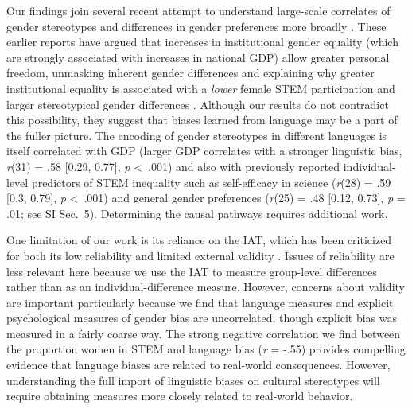 \documentclass[9pt,twocolumn,twoside,lineno]{pnas-new}
\begin{document}
Our findings join several recent attempt to understand large-scale correlates of gender stereotypes 
\cite{stoet2018gender} and differences in gender preferences more broadly \cite{falk2018relationship}. These earlier reports have argued that increases in institutional gender equality (which are strongly associated with increases in national GDP) allow greater personal freedom, unmasking inherent gender differences and explaining why greater institutional equality is associated with a \textit{lower} female STEM participation \cite{stoet2018gender} and larger stereotypical gender differences \citep[e.g., women being more risk averse and less patient than men;][]{falk2018relationship}. Although our results do not contradict this possibility, they suggest that biases learned from language may be a part of the fuller picture. The encoding of gender stereotypes in different languages is itself correlated with GDP (larger GDP correlates with a stronger linguistic bias, \emph{r}(31) = .58 {[}0.29, 0.77{]}, \emph{p} \textless\ .001) and also with previously reported individual-level predictors of STEM inequality such as self-efficacy in science  (\emph{r}(28) = .59 {[}0.3, 0.79{]}, \emph{p} \textless\ .001) and general gender preferences (\emph{r}(25) = .48 {[}0.12, 0.73{]}, \emph{p} = .01; see SI Sec.\ 5). Determining the causal pathways requires additional work. 

One limitation of our work is its reliance on the IAT, which has been criticized for both its low reliability \cite{lane2007understanding} and limited external validity \cite{fazio2003implicit}. Issues of reliability are less relevant here because we use the IAT to measure group-level differences rather than as an individual-difference measure. However, concerns about validity are important particularly because we find that language measures and explicit psychological measures of gender bias are uncorrelated, though explicit bias was measured in a fairly coarse way. The strong negative correlation we find between the proportion women in STEM and language bias (\emph{r} = -.55) provides compelling evidence that language biases are related to real-world consequences. However, understanding the full import of linguistic biases on cultural stereotypes will require obtaining measures more closely related to real-world behavior. 
\end{document}
